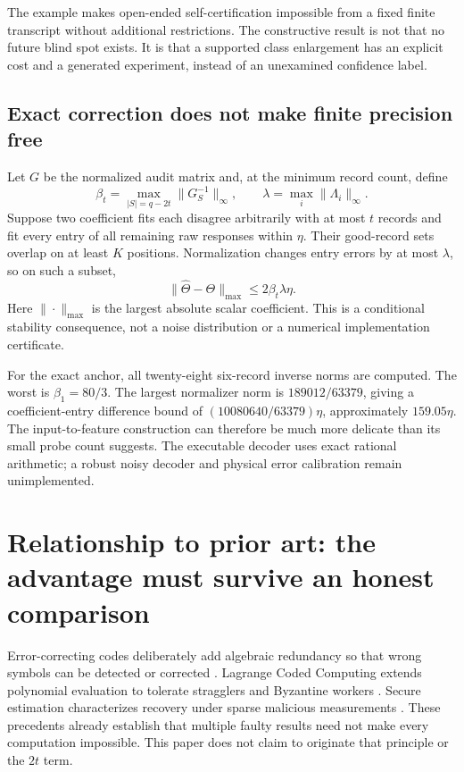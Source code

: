 \documentclass[11pt,letterpaper]{article}
\theoremstyle{remark}\newtheorem{remark}{Remark}[section]
\begin{document}
The example makes open-ended self-certification impossible from a fixed finite transcript without additional restrictions. The constructive result is not that no future blind spot exists. It is that a supported class enlargement has an explicit cost and a generated experiment, instead of an unexamined confidence label.

\subsection{Exact correction does not make finite precision free}
Let $G$ be the normalized audit matrix and, at the minimum record count, define
\begin{equation}
 \beta_t=\max_{|S|=q-2t}\|G_S^{-1}\|_\infty,\qquad
 \lambda=\max_i\|\Lambda_i\|_\infty.
\end{equation}
Suppose two coefficient fits each disagree arbitrarily with at most $t$ records and fit every entry of all remaining raw responses within $\eta$. Their good-record sets overlap on at least $K$ positions. Normalization changes entry errors by at most $\lambda$, so on such a subset,
\begin{equation}
 \|\widehat\Theta-\Theta\|_{\max}\le2\beta_t\lambda\eta.\label{eq:noise}
\end{equation}
Here $\|\cdot\|_{\max}$ is the largest absolute scalar coefficient. This is a conditional stability consequence, not a noise distribution or a numerical implementation certificate.

For the exact anchor, all twenty-eight six-record inverse norms are computed. The worst is $\beta_1=80/3$. The largest normalizer norm is $189012/63379$, giving a coefficient-entry difference bound of $(10080640/63379)\eta$, approximately $159.05\eta$. The input-to-feature construction can therefore be much more delicate than its small probe count suggests. The executable decoder uses exact rational arithmetic; a robust noisy decoder and physical error calibration remain unimplemented.

\section{Relationship to prior art: the advantage must survive an honest comparison}
\label{sec:prior}
Error-correcting codes deliberately add algebraic redundancy so that wrong symbols can be detected or corrected \citep{reed}. Lagrange Coded Computing extends polynomial evaluation to tolerate stragglers and Byzantine workers \citep{lcc}. Secure estimation characterizes recovery under sparse malicious measurements \citep{fawzi}. These precedents already establish that multiple faulty results need not make every computation impossible. This paper does not claim to originate that principle or the $2t$ term.
\end{document}
